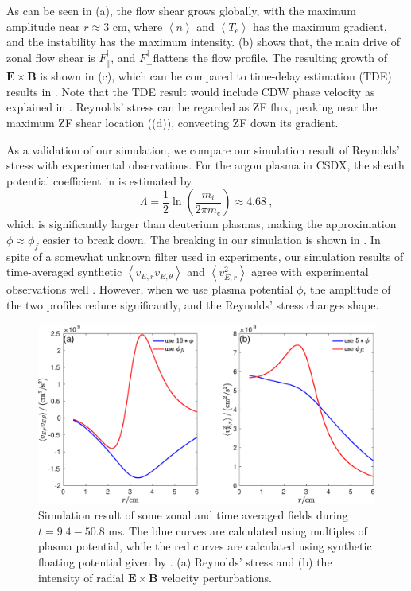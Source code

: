 \documentclass[aps,pre,twocolumn,superscriptaddress]{revtex4-2}
\begin{document}
As can be seen in (a), the flow shear grows globally, with the maximum amplitude near $r\approx 3$ cm, where $\left<n\right>$ and $\left<T_{e}\right>$ has the maximum gradient, and the instability has the maximum intensity. (b) shows that, the main drive of zonal flow shear is $F_{\parallel}^{\dagger}$, and $F_{\perp}^{\dagger}$flattens the flow profile. The resulting growth of $\bm{E}\times\bm{B}$ is shown in (c), which can be compared to time-delay estimation (TDE) results in \cite{PhysRevLett.104.065002,doi:10.1063/1.3322823}. Note that the TDE result would include CDW phase velocity as explained in \cite{PhysRevE.100.033212}. Reynolds' stress can be regarded as ZF flux, peaking near the maximum ZF shear location ((d)), convecting ZF down its gradient. 


As a validation of our simulation, we compare our simulation result of Reynolds' stress with experimental observations. For the argon plasma in CSDX, the sheath potential coefficient in  is estimated by \cite{Nie_2018}
\begin{equation}
	\Lambda=\frac{1}{2}\ln\left(\frac{m_{i}}{2\pi m_{e}}\right)\approx 4.68~,
\label{eq:Lamda}
\end{equation}
which is significantly larger than deuterium plasmas, making the approximation $\phi\approx\phi_{f}$ easier to break down. The breaking in our simulation is shown in . In spite of a somewhat unknown filter used in experiments, our simulation results of time-averaged synthetic $\left<v_{E,r}v_{E,\theta}\right>$ and $\left<v_{E,r}^{2}\right>$ agree with experimental observations well \cite{doi:10.1063/1.2985836,PhysRevLett.104.065002}. However, when we use plasma potential $\phi$, the amplitude of the two profiles reduce significantly, and the Reynolds' stress changes shape.

\begin{figure}[htb]
	\includegraphics[width=3.375 in]{comp_pl_fl.eps}
	\caption{
		Simulation result of some zonal and time averaged fields during $t=9.4-50.8$ ms. The blue curves are calculated using multiples of plasma potential, while the red curves are calculated using synthetic floating potential given by . (a) Reynolds' stress and (b) the intensity of radial $\bm{E}\times\bm{B}$ velocity perturbations.
		\label{fig:comp_pl_fl}	
	}
\end{figure}



\end{document}
